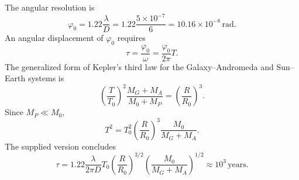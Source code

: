 The angular resolution is
\[
\varphi_0=1.22\frac{\lambda}{D}
=1.22\frac{5\times10^{-7}}6=10.16\times10^{-8}\,\mathrm{rad}.
\]
An angular displacement of $\varphi_0$ requires
\[
\tau=\frac{\varphi_0}{\omega}=\frac{\varphi_0}{2\pi}T.
\]
The generalized form of Kepler's third law for the Galaxy--Andromeda and
Sun--Earth systems is
\[
\left(\frac{T}{T_0}\right)^2
\frac{M_G+M_A}{M_0+M_P}=\left(\frac{R}{R_0}\right)^3.
\]
Since $M_P\ll M_0$,
\[
T^2=T_0^2\left(\frac{R}{R_0}\right)^3\frac{M_0}{M_G+M_A}.
\]
The supplied version concludes
\[
\tau=1.22\frac{\lambda}{2\pi D}T_0
\left(\frac{R}{R_0}\right)^{3/2}
\left(\frac{M_0}{M_G+M_A}\right)^{1/2}\approx10^3\,\mathrm{years}.
\]
